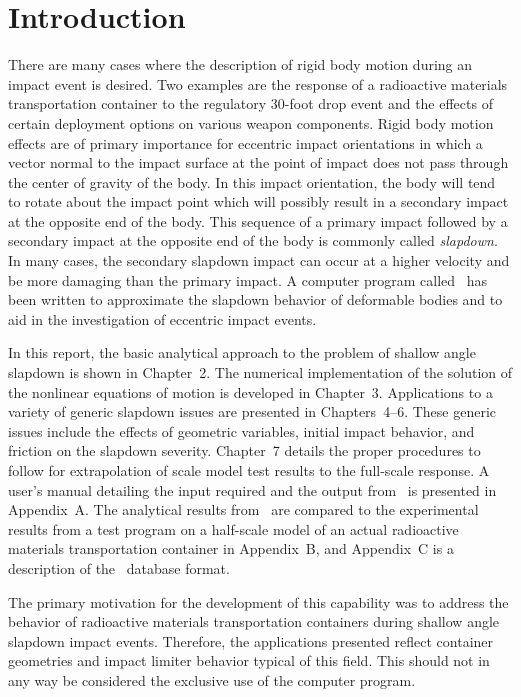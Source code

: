 \chapter{Introduction}

     There are many cases where the description of rigid body motion
during an impact event is desired.  Two examples are the response of a
radioactive materials transportation container to the regulatory
30-foot drop event and the effects of certain deployment options on
various weapon components. Rigid body motion effects are of primary
importance for eccentric impact orientations in which a vector normal
to the impact surface at the point of impact does not pass through the
center of gravity of the body.  In this impact orientation, the body
will tend to rotate about the impact point which will possibly result
in a secondary impact at the opposite end of the body.  This sequence
of a primary impact followed by a secondary impact at the opposite end
of the body is commonly called {\em slapdown}.  In many cases, the
secondary slapdown impact can occur at a higher velocity and be more
damaging than the primary impact. A computer program called \SLAP\ has
been written to approximate the slapdown behavior of deformable bodies
and to aid in the investigation of eccentric impact events. 

In this report, the basic analytical approach to the problem of shallow angle
slapdown is shown in Chapter~2.  The numerical implementation of the solution
of the nonlinear equations of motion is developed in Chapter~3.  Applications
to a variety of generic slapdown issues are presented in Chapters~4--6.  These
generic issues include the effects of geometric variables, initial impact
behavior, and friction on the slapdown severity.  Chapter~7 details the proper
procedures to follow for extrapolation of scale model test results to the
full-scale response. A user's manual detailing the input required and the
output from \SLAP\ is presented in Appendix~A. The analytical results from
\SLAP\ are compared to the experimental results from a test program on a
half-scale model of an actual radioactive materials transportation container in
Appendix~B, and Appendix~C is a description of the \EXO\ database format.

The primary motivation for the development of this capability was to address
the behavior of radioactive materials transportation containers during shallow
angle slapdown impact events.  Therefore, the applications presented reflect
container geometries and impact limiter behavior typical of this field.  This
should not in any way be considered the exclusive use of the computer program. 
